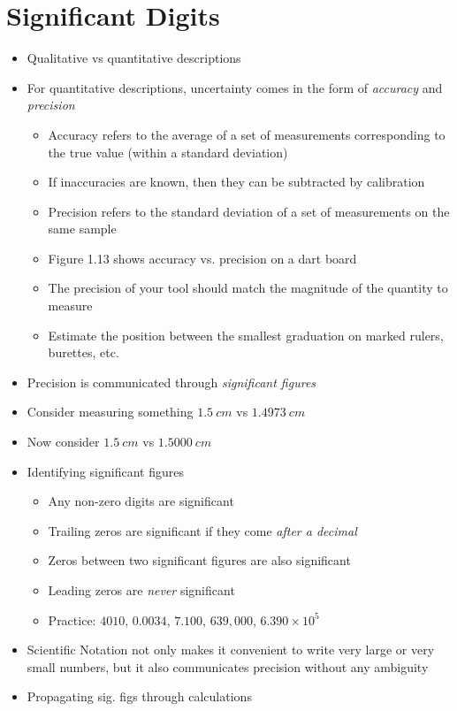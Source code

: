 \documentclass[12pt, openany, letterpaper]{memoir}
\begin{document}
\section{Significant Digits}
\begin{itemize}
	\item Qualitative vs quantitative descriptions
	\item For quantitative descriptions, uncertainty comes in the form of \emph{accuracy} and \emph{precision}
	\begin{itemize}
		\item Accuracy refers to the average of a set of measurements corresponding to the true value (within a standard deviation)
		\item If inaccuracies are known, then they can be subtracted by calibration
		\item Precision refers to the standard deviation of a set of measurements on the same sample
		\item Figure 1.13 shows accuracy vs. precision on a dart board
		\item The precision of your tool should match the magnitude of the quantity to measure
		\item Estimate the position between the smallest graduation on marked rulers, burettes, etc.
	\end{itemize}
	\item Precision is communicated through \emph{significant figures}
	\item Consider measuring something $1.5~cm$ vs $1.4973~cm$
	\item Now consider $1.5~cm$ vs $1.5000~cm$
	\item Identifying significant figures
	\begin{itemize}
		\item Any non-zero digits are significant
		\item Trailing zeros are significant if they come \emph{after a decimal}
		\item Zeros between two significant figures are also significant
		\item Leading zeros are \emph{never} significant
		\item Practice: $4010$, $0.0034$, $7.100$, $639,000$, $6.390\times10^{5}$
	\end{itemize}
	\item Scientific Notation not only makes it convenient to write very large or very small numbers, but it also communicates precision without any ambiguity
	\item Propagating sig. figs through calculations

\end{itemize}
\end{document}

